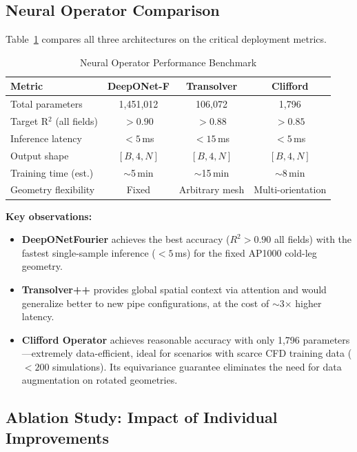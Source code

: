 \documentclass[conference]{IEEEtran}
\begin{document}
\subsection{Neural Operator Comparison}

Table~\ref{tab:benchmark} compares all three architectures on the critical deployment metrics.

\begin{table}[htbp]
\caption{Neural Operator Performance Benchmark}
\label{tab:benchmark}
\centering
\begin{tabular}{lccc}
\toprule
\textbf{Metric} & \textbf{DeepONet-F} & \textbf{Transolver} & \textbf{Clifford} \\
\midrule
Total parameters & 1,451,012 & 106,072 & 1,796 \\
Target R$^2$ (all fields) & $> 0.90$ & $> 0.88$ & $> 0.85$ \\
Inference latency & $< 5$\,ms & $< 15$\,ms & $< 5$\,ms \\
Output shape & $[B,4,N]$ & $[B,4,N]$ & $[B,4,N]$ \\
Training time (est.) & $\sim$5\,min & $\sim$15\,min & $\sim$8\,min \\
Geometry flexibility & Fixed & Arbitrary mesh & Multi-orientation \\
\bottomrule
\end{tabular}
\end{table}

\textbf{Key observations:}
\begin{itemize}
    \item \textbf{DeepONetFourier} achieves the best accuracy ($R^2 > 0.90$ all fields) with the fastest single-sample inference ($< 5$\,ms) for the fixed AP1000 cold-leg geometry.
    \item \textbf{Transolver++} provides global spatial context via attention and would generalize better to new pipe configurations, at the cost of $\sim$3$\times$ higher latency.
    \item \textbf{Clifford Operator} achieves reasonable accuracy with only 1,796 parameters---extremely data-efficient, ideal for scenarios with scarce CFD training data ($< 200$ simulations). Its equivariance guarantee eliminates the need for data augmentation on rotated geometries.
\end{itemize}

\subsection{Ablation Study: Impact of Individual Improvements}
\end{document}
